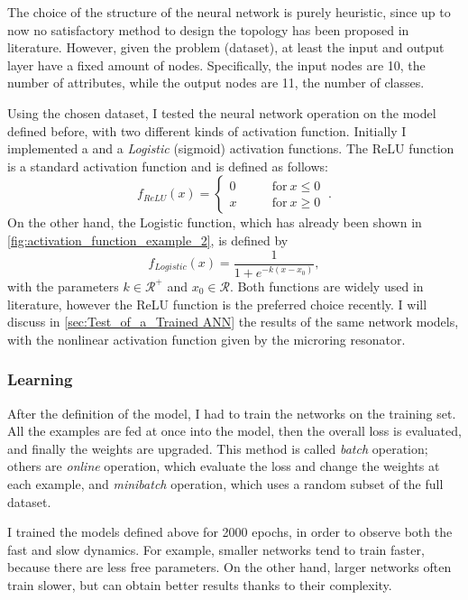 The choice of the structure of the neural network is purely heuristic, since up to now no satisfactory method to design the topology has been proposed in literature.
However, given the problem (dataset), at least the input and output layer have a fixed amount of nodes.
Specifically, the input nodes are \num{10}, the number of attributes, while the output nodes are \num{11}, the number of classes.

Using the chosen dataset, I tested the neural network operation on the model defined before, with two different kinds of activation function.
Initially I implemented a  and a \textit{Logistic} (sigmoid) activation functions.
The \acs{ReLU} function is a standard activation function and is defined as follows:
\begin{equation}
f_{ReLU}(x) =
\begin{cases}
	0 & \qquad \mathrm{for}~ x\leq 0\\
	x & \qquad \mathrm{for}~ x\geq 0
\end{cases}~.
\label{eq:relu}
\end{equation}
On the other hand, the Logistic function, which has already been shown in \autoref{fig:activation_function_example_2}, is defined by
\begin{equation}
f_{Logistic}(x) = \frac{1}{1+e^{-k\left(x-x_0\right)}},
\end{equation}
with the parameters $k\in \mathcal{R}^+$ and $x_0\in \mathcal{R}$.
Both functions are widely used in literature, however the \acs{ReLU} function is the preferred choice recently.
I will discuss in \autoref{sec:Test_of_a_Trained ANN} the results of the same network models, with the nonlinear activation function given by the microring resonator.

\subsubsection{Learning}
After the definition of the model, I had to train the networks on the training set.
All the examples are fed at once into the model, then the overall loss is evaluated, and finally the weights are upgraded.
This method is called \textit{batch} operation; others are \textit{online} operation, which evaluate the loss and change the weights at each example, and \textit{minibatch} operation, which uses a random subset of the full dataset.

I trained the models defined above for \num{2000} epochs, in order to observe both the fast and slow dynamics.
For example, smaller networks tend to train faster, because there are less free parameters.
On the other hand, larger networks often train slower, but can obtain better results thanks to their complexity.

